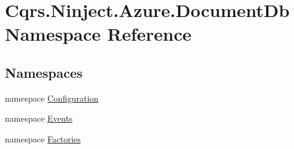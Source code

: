 \hypertarget{namespaceCqrs_1_1Ninject_1_1Azure_1_1DocumentDb}{}\section{Cqrs.\+Ninject.\+Azure.\+Document\+Db Namespace Reference}
\label{namespaceCqrs_1_1Ninject_1_1Azure_1_1DocumentDb}
\subsection*{Namespaces}
\begin{DoxyCompactItemize}
\item 
namespace \hyperlink{namespaceCqrs_1_1Ninject_1_1Azure_1_1DocumentDb_1_1Configuration}{Configuration}
\item 
namespace \hyperlink{namespaceCqrs_1_1Ninject_1_1Azure_1_1DocumentDb_1_1Events}{Events}
\item 
namespace \hyperlink{namespaceCqrs_1_1Ninject_1_1Azure_1_1DocumentDb_1_1Factories}{Factories}
\end{DoxyCompactItemize}
